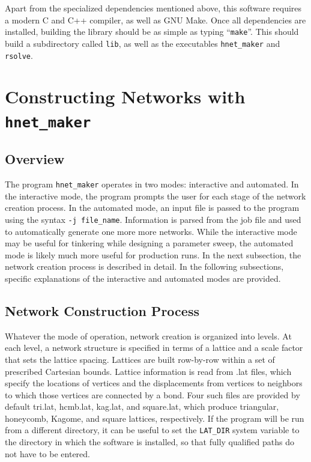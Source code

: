 \documentclass{article}
\begin{document}
Apart from the specialized dependencies mentioned above, this software requires
a modern C and C++ compiler, as well as GNU Make. Once all dependencies are
installed, building the library should be as simple as typing ``\texttt{make}''.
This should build a subdirectory called \texttt{lib}, as well as the
executables \texttt{hnet\_maker} and \texttt{rsolve}.

\section{Constructing Networks with \texttt{hnet\_maker}}

\subsection{Overview}

The program \texttt{hnet\_maker} operates in two modes: interactive and
automated. In the interactive mode, the program prompts the user for each
stage of the network creation process. In the automated mode, an input
file is passed to the program using the syntax \texttt{-j file\_name}.
Information is parsed from the job file and used to automatically generate
one more more networks. While the interactive mode may be useful for tinkering
while designing a parameter sweep, the automated mode is likely much more
useful for production runs. In the next subsection, the network creation process
is described in detail. In the following subsections, specific explanations of 
the interactive and automated modes are provided.

\subsection{Network Construction Process}

Whatever the mode of operation, network creation is organized into levels.
At each level, a network structure is specified in terms of a lattice and
a scale factor that sets the lattice spacing. Lattices are built row-by-row
within a set of prescribed Cartesian bounds. Lattice information is read from
.lat files, which specify the locations of vertices and the displacements from
vertices to neighbors to which those vertices are connected by a bond. Four such
files are provided by default tri.lat, hcmb.lat, kag.lat, and square.lat, which
produce triangular, honeycomb, Kagome, and square lattices, respectively. If the
program will be run from a different directory, it can be useful to set the
\texttt{LAT\_DIR} system variable to the directory in which the software is
installed, so that fully qualified paths do not have to be entered.
\end{document}
